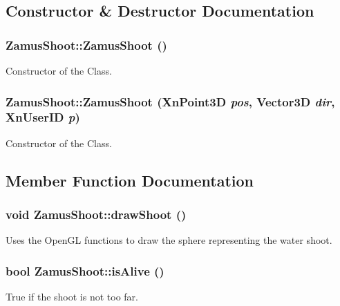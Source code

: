 \subsection{Constructor \& Destructor Documentation}
\hypertarget{classZamusShoot_afa64b29375e211b297ef9df3b62df407}{
\subsubsection[{ZamusShoot}]{\setlength{\rightskip}{0pt plus 5cm}ZamusShoot::ZamusShoot ()}}
\label{classZamusShoot_afa64b29375e211b297ef9df3b62df407}
Constructor of the Class. \hypertarget{classZamusShoot_a095a021221dda360f8d907a10c93d8f4}{
\subsubsection[{ZamusShoot}]{\setlength{\rightskip}{0pt plus 5cm}ZamusShoot::ZamusShoot (XnPoint3D {\em pos}, \/  {\bf Vector3D} {\em dir}, \/  XnUserID {\em p})}}
\label{classZamusShoot_a095a021221dda360f8d907a10c93d8f4}
Constructor of the Class. 

\subsection{Member Function Documentation}
\hypertarget{classZamusShoot_a45f1492b67c2d5aa7b370db5a964152b}{
\subsubsection[{drawShoot}]{\setlength{\rightskip}{0pt plus 5cm}void ZamusShoot::drawShoot ()}}
\label{classZamusShoot_a45f1492b67c2d5aa7b370db5a964152b}
Uses the OpenGL functions to draw the sphere representing the water shoot. \hypertarget{classZamusShoot_a2cf4ee36add75a60a667d04f59b1fd03}{
\subsubsection[{isAlive}]{\setlength{\rightskip}{0pt plus 5cm}bool ZamusShoot::isAlive ()}}
\label{classZamusShoot_a2cf4ee36add75a60a667d04f59b1fd03}
True if the shoot is not too far.

